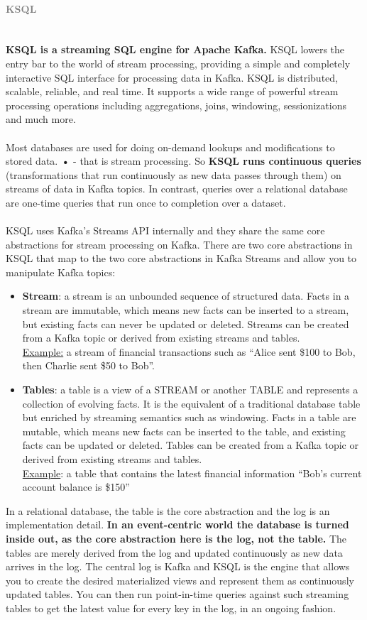 \documentclass[10pt,a4paper]{article}
\newcommand{\nline}{\\~\\}
\newcommand{\myparagraph}[1]{\paragraph{\normalsize{\textcolor{gray}{\uppercase{\textbf{#1}}}} }\mbox{} \vspace{0.5em}\\}
\begin{document}
\myparagraph{KSQL}
\textbf{KSQL is a streaming SQL engine for Apache Kafka.} KSQL lowers the entry bar to the world of stream processing, providing a simple and completely interactive SQL interface for processing data in Kafka. KSQL is distributed, scalable, reliable, and real time. It supports a wide range of powerful stream processing operations including aggregations, joins, windowing, sessionizations and much more.
\nline
Most databases are used for doing on-demand lookups and modifications to stored data. \textbf{•} - that is stream processing. So \textbf{KSQL runs continuous queries} (transformations that run continuously as new data passes through them) on streams of data in Kafka topics. In contrast, queries over a relational database are one-time queries that run once to completion over a dataset.
\nline
KSQL uses Kafka’s Streams API internally and they share the same core abstractions for stream processing on Kafka. There are two core abstractions in KSQL that map to the two core abstractions in Kafka Streams and allow you to manipulate Kafka topics:
\begin{itemize}
	\item \textbf{Stream}: a stream is an unbounded sequence of structured data. Facts in a stream are immutable, which means new facts can be inserted to a stream, but existing facts can never be updated or deleted. Streams can be created from a Kafka topic or derived from existing streams and tables. \\
\uline{Example:}
a stream of financial transactions such as “Alice sent \$100 to Bob, then Charlie sent \$50 to Bob”.
	\item \textbf{Tables}: a table is a view of a STREAM or another TABLE and represents a collection of evolving facts. It is the equivalent of a traditional database table but enriched by streaming semantics such as windowing. Facts in a table are mutable, which means new facts can be inserted to the table, and existing facts can be updated or deleted. Tables can be created from a Kafka topic or derived from existing streams and tables. \\
\uline{Example}:
a table that contains the latest financial information “Bob’s current account balance is \$150”
\end{itemize}
In a relational database, the table is the core abstraction and the log is an implementation detail. \textbf{In an event-centric world the database is turned inside out, as the core abstraction here is the log, not the table.} The tables are merely derived from the log and updated continuously as new data arrives in the log. The central log is Kafka and KSQL is the engine that allows you to create the desired materialized views and represent them as continuously updated tables. You can then run point-in-time queries against such streaming tables to get the latest value for every key in the log, in an ongoing fashion.
\end{document}
